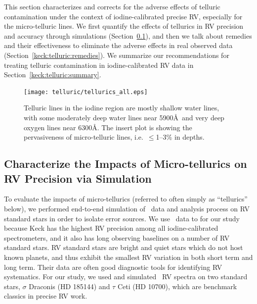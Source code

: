 This section characterizes and corrects for the adverse effects of
telluric contamination under the context of iodine-calibrated precise
RV, especially for the micro-telluric lines. We first quantify the
effects of tellurics in RV precision and accuracy through simulations
(Section~\ref{keck:telluric:impact}), and then we talk about remedies
and their effectiveness to eliminate the adverse effects in real
observed data (Section~\ref{keck:telluric:remedies}). We summarize our
recommendations for treating telluric contamination in
iodine-calibrated RV data in Section~\ref{keck:telluric:summary}.


\begin{figure}
\texttt{[image: telluric/tellurics\_all.eps]} 
\caption{Telluric lines in the iodine region are mostly shallow water
lines, with some moderately deep water lines near 5900\AA\ and very
deep oxygen lines near 6300\AA. The insert plot is showing the
pervasiveness of micro-telluric lines, i.e.~$\leq$1--3\% in depths.
\label{telluric:fig:telluric}}
\end{figure}



\subsection{Characterize the Impacts of Micro-tellurics on RV
  Precision via Simulation}\label{keck:telluric:impact} 

To evaluate the impacts of micro-tellurics (referred to often simply
as ``tellurics'' below), we performed end-to-end simulation of \keck\
data and analysis process on RV standard stars in order to isolate
error sources. We use \keck\ data to for our study because Keck has
the highest RV precision among all iodine-calibrated spectrometers,
and it also has long observing baselines on a number of RV standard
stars. RV standard stars are bright and quiet stars which do not host
known planets, and thus exhibit the smallest RV variation in both
short term and long term. Their data are often good diagnostic tools
for identifying RV systematics. For our study, we used and simulated
\keck\ RV spectra on two standard stars, $\sigma$ Draconis (HD 185144)
and $\tau$ Ceti (HD 10700), which are benchmark classics in precise RV
work.

